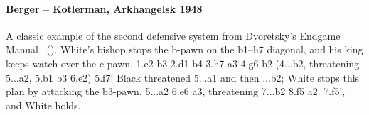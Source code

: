 
\paragraph{Berger -- Kotlerman, Arkhangelsk 1948}
A classic example of the second defensive system from
Dvoretsky's Endgame Manual~\cite{Dvoretsky:2008-endgame-manual} ().
White's bishop stops the b-pawn on the b1--h7 diagonal, and his king keeps watch over the e-pawn.
1.\K e2 b3 2.\K d1 \K b4 3.\B h7 \K a3 4.\B g6 \K b2 (4...b2, threatening 5...\K a2, 5.\B b1 \K b3
6.\K e2) 5.\B f7! Black threatened 5...\K a1 and then ...b2; White stops this plan by attacking the
b3-pawn. 5...\K a2 6.\B e6 \K a3, threatening 7...b2 8.\B f5 \K a2. 7.\B f5!, and White holds.
